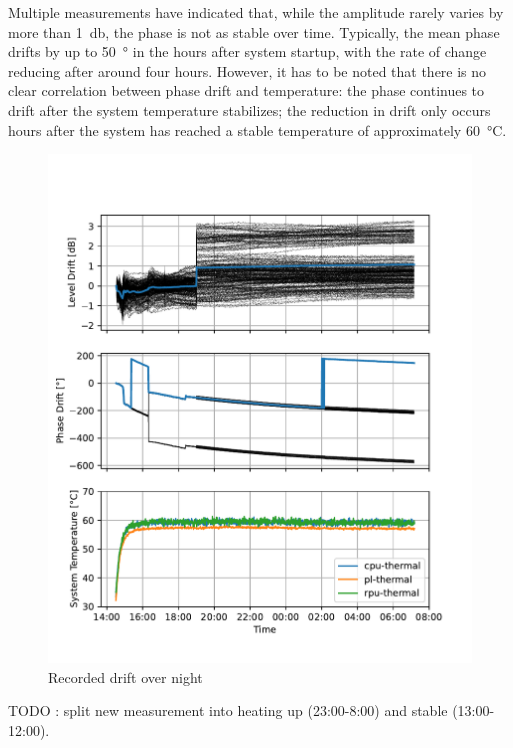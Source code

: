 Multiple measurements have indicated that, while the amplitude rarely varies by more than \SI{1}{\decibel}, the phase is not as stable over time.
Typically, the mean phase drifts by up to \SI{50}{\degree} in the hours after system startup, with the rate of change reducing after around four hours.
However, it has to be noted that there is no clear correlation between phase drift and temperature:
the phase continues to drift after the system temperature stabilizes;
the reduction in drift only occurs hours after the system has reached a stable temperature of approximately \SI{60}{\celsius}.

\begin{figure}
    \centering
    \includegraphics[width=\textwidth]{../figures/meas_23-10-09_phase_drift.pdf}
    \caption{Recorded drift over night}
    \label{fig:weekend}
\end{figure}
TODO : split new measurement into heating up (23:00-8:00) and stable (13:00-12:00).


